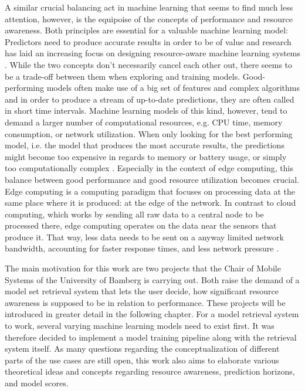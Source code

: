 A similar crucial balancing act in machine learning that seems to find much less attention, however, is the equipoise of the concepts of performance and resource awareness. Both principles are essential for a valuable machine learning model: Predictors need to produce accurate results in order to be of value and research has laid an increasing focus on designing resource-aware machine learning systems \cite{rapp2022}. While the two concepts don’t necessarily cancel each other out, there seems to be a trade-off between them when exploring and training models. Good-performing models often make use of a big set of features and complex algorithms and in order to produce a stream of up-to-date predictions, they are often called in short time intervals. Machine learning models of this kind, however, tend to demand a larger number of computational resources, e.g. CPU time, memory consumption, or network utilization. When only looking for the best performing model, i.e. the model that produces the most accurate results, the predictions might become too expensive in regards to memory or battery usage, or simply too computationally complex \cite{preuveneers2020}. Especially in the context of edge computing, this balance between good performance and good resource utilization becomes crucial. Edge computing is a computing paradigm that focuses on processing data at the same place where it is produced: at the edge of the network. In contrast to cloud computing, which works by sending all raw data to a central node to be processed there, edge computing operates on the data near the sensors that produce it. That way, less data needs to be sent on a anyway limited network bandwidth, accounting for faster response times, and less network pressure \cite{shi2016}.

The main motivation for this work are two projects that the Chair of Mobile Systems of the University of Bamberg is carrying out. Both raise the demand of a model set retrieval system that lets the user decide, how significant resource awareness is supposed to be in relation to performance. These projects will be introduced in greater detail in the following chapter. For a model retrieval system to work, several varying machine learning models need to exist first. It was therefore decided to implement a model training pipeline along with the retrieval system itself. As many questions regarding the conceptualization of different parts of the use cases are still open, this work also aims to elaborate various theoretical ideas and concepts regarding resource awareness, prediction horizons, and model scores.

